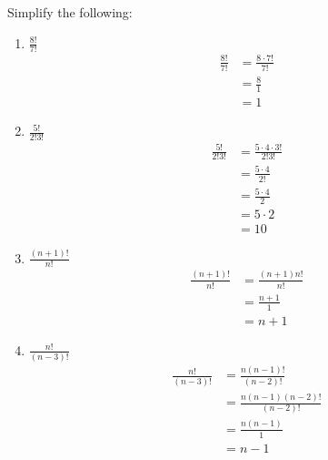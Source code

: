 \guard



\begin{exmp}
\label{exmp:simplifyFactorials}
  Simplify the following:
  \begin{enumerate}
    \item $\frac{8!}{7!}$
      \begin{align*}
        \frac{8!}{7!} &= \frac{8\cdot 7!}{7!} \\
                      &= \frac{8}{1} \\
                      &= 1
      \end{align*}
    \item $\frac{5!}{2!3!}$
      \begin{align*}
        \frac{5!}{2!3!} &= \frac{5\cdot 4\cdot 3!}{2!3!} \\
                        &= \frac{5\cdot 4}{2!} \\
                        &= \frac{5\cdot 4}{2} \\
                        &= 5\cdot 2 \\
                        &= 10
      \end{align*}
    \item $\frac{(n+1)!}{n!}$
      \begin{align*}
        \frac{(n+1)!}{n!} &= \frac{(n+1)n!}{n!} \\
                          &= \frac{n+1}{1} \\
                          &= n+1
      \end{align*}
    \item $\frac{n!}{(n-3)!}$
      \begin{align*}
        \frac{n!}{(n-3)!} &= \frac{n(n-1)!}{(n-2)!} \\
                          &= \frac{n(n-1)(n-2)!}{(n-2)!} \\
                          &= \frac{n(n-1)}{1} \\
                          &= n-1
      \end{align*}
  \end{enumerate}
\end{exmp}
